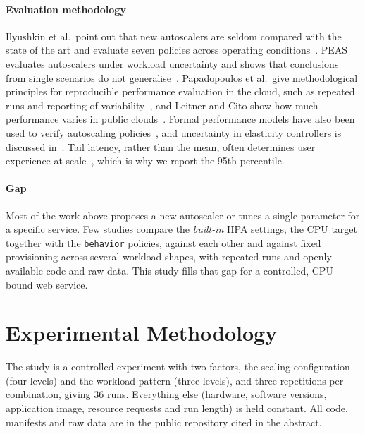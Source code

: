 \documentclass[conference,a4paper]{IEEEtran}
\begin{document}
\paragraph{Evaluation methodology}
Ilyushkin et al.\ point out that new autoscalers are seldom compared with the
state of the art and evaluate seven policies across operating
conditions~\cite{ilyushkin2018an}. PEAS evaluates autoscalers under workload
uncertainty and shows that conclusions from single scenarios do not
generalise~\cite{papadopoulos2016peas}. Papadopoulos et al.\ give
methodological principles for reproducible performance evaluation in the
cloud, such as repeated runs and reporting of
variability~\cite{papadopoulos2021methodological}, and Leitner and Cito show
how much performance varies in public clouds~\cite{leitner2016patterns}.
Formal performance models have also been used to verify autoscaling
policies~\cite{evangelidis2018performance}, and uncertainty in elasticity
controllers is discussed in~\cite{jamshidi2016managing}. Tail latency, rather
than the mean, often determines user experience at
scale~\cite{dean2013the}, which is why we report the 95th percentile.

\paragraph{Gap}
Most of the work above proposes a new autoscaler or tunes a single parameter
for a specific service. Few studies compare the \emph{built-in} HPA settings,
the CPU target together with the \texttt{behavior} policies, against each
other and against fixed provisioning across several workload shapes, with
repeated runs and openly available code and raw data. This study fills that
gap for a controlled, CPU-bound web service.

\section{Experimental Methodology}
\label{sec:method}

The study is a controlled experiment with two factors, the scaling
configuration (four levels) and the workload pattern (three levels), and three
repetitions per combination, giving 36 runs. Everything else (hardware,
software versions, application image, resource requests and run length) is
held constant. All code, manifests and raw data are in the public repository
cited in the abstract.
\end{document}
